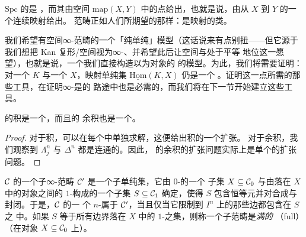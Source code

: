 \begin{observation}\label{obs:spc-objects}
$\mathrm{Spc}$ 的\trObject{}是 \trCWComplex{}，而其\trMorphism{}由空间
$\mathrm{map}(X, Y)$ 中的点给出，也就是说，由从 $X$ 到 $Y$ 的一个连续映射给出。
\trHomotopy{}范畴正如人们所期望的那样：\trMorphism{}是映射的\trHomotopy{}类。
\end{observation}

\begin{remark}\label{rem:purely-simplicial-model}
我们希望有空间∞-范畴的一个「纯单纯」模型（这话说来有点别扭——但它源于我们想把
Kan 复形/空间视为∞-\trGroupoid{}、并希望此后让空间与\trInfinityCategories{}处于平等
地位这一愿望），也就是说，一个我们直接构造以\trKanComplex{}为对象的%
\trSimplicialCategory{}的模型。为此，我们将需要证明：对一个\trSimplicialSet{} $K$
与一个\trKanComplex{} $X$，映射单纯集 $\underline{\mathrm{Hom}}(K, X)$ 仍是一个%
\trKanComplex{}。证明这一点所需的那些工具，在证明∞-\trGroupoid{}是\trKanComplex{}的
路途中也是必需的，而我们将在下一节开始建立这些工具。
\end{remark}

\begin{lemma}\label{lem:product-coproduct-infinity-categories}
\trInfinityCategories{}的积是一个\trInfinityCategory{}，而且\trInfinityCategories{}的
余积也是一个\trInfinityCategory{}。
\end{lemma}

\begin{proof}
对于积，可以在每个\trInfinityCategory{}中单独求解\trLiftingProblem{}，这便给出积的一个扩张。
对于余积，我们观察到 $\Lambda^n_j$ 与 $\Delta^n$ 都是连通的。因此，
\trInfinityCategories{}的余积的扩张问题实际上是单个\trInfinityCategory{}的扩张
问题。
\end{proof}

\begin{definition}\label{def:sub-infinity-category}
\trInfinityCategory{} $\mathcal{C}$ 的一个子∞-范畴 $\mathcal{C}'$ 是一个子单纯集，它由 $0$-\trSimplex{}的一个
子集 $X \subseteq \mathcal{C}_0$ 与由落在 $X$ 中的对象之间的 $1$-\trSimplex{}构成的一个子集
$S \subseteq \mathcal{C}_1$ 确定，使得 $S$ 包含恒等元并对合成与\trEquivalence{}封闭。于是，$\mathcal{C}$ 的一
个 $n$-\trSimplex{}属于 $\mathcal{C}'$，当且仅当它限制到\trSpine{} $I^n$ 上的那些边都包含在 $S$ 之
中。如果 $S$ 等于所有边界落在 $X$ 中的 $1$-\trSimplex{}之集，则称一个子范畴是\emph{满的}
（full）（在对象 $X \subseteq \mathcal{C}_0$ 上）。
\end{definition}

